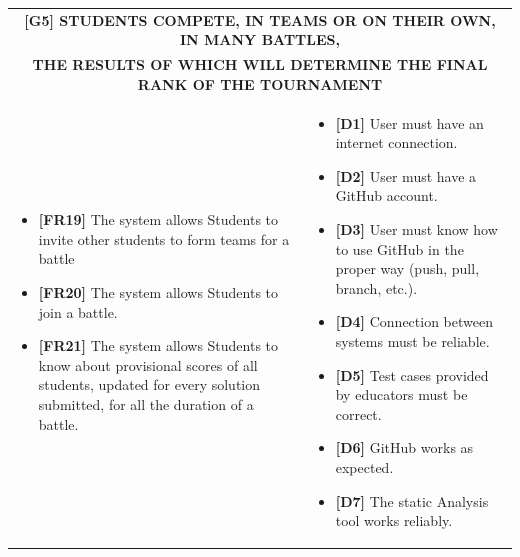 \documentclass{article}
\begin{document}
\begin{table}
\begin{adjustwidth}{-1in}{-1in}
 \renewcommand{\arraystretch}{1.5}
    \begin{tabular}{|p{9.5cm}|p{9.5cm}|}
        \hline
        \multicolumn{2}{|c|}{\textbf{[G5] STUDENTS COMPETE, IN TEAMS OR ON THEIR OWN, IN MANY BATTLES,}} \\
        \multicolumn{2}{|c|}{\textbf{THE RESULTS OF WHICH WILL DETERMINE THE FINAL RANK OF THE TOURNAMENT}} \\
        \hline
        \begin{itemize}[label={}, left=0pt, align=left, itemsep=5pt]
            \item \textbf{[FR19]} The system allows Students to invite other students to form teams for a battle
            \item \textbf{[FR20]} The system allows Students to join a battle.
            \item \textbf{[FR21]} The system allows Students to know about provisional scores of all students, updated for every solution submitted, for all the duration of a battle.
        \end{itemize} &
        \begin{itemize}[label={}, left=0pt, align=left, itemsep=5pt]
            \item \textbf{[D1]} User must have an internet connection.
            \item \textbf{[D2]} User must have a GitHub account.
            \item \textbf{[D3]} User must know how to use GitHub in the proper way (push, pull, branch, etc.).
            \item \textbf{[D4]} Connection between systems must be reliable.
            \item \textbf{[D5]} Test cases provided by educators must be correct.
            \item \textbf{[D6]} GitHub works as expected.
            \item \textbf{[D7]} The static Analysis tool works reliably.
        \end{itemize} \\
        \hline
    \end{tabular}
\end{adjustwidth}
\end{table}
\end{document}
